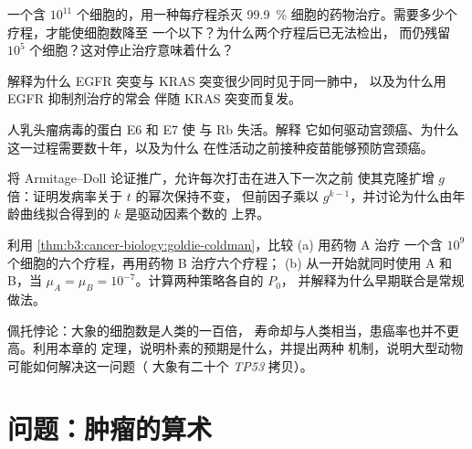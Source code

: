 \begin{exercise}[$\star\star$]\label{exo:b3:cancer-biology:7}
一个含 $10^{11}$ 个细胞的，用一种每疗程杀灭
\qty{99.9}{\%} 细胞的药物治疗。需要多少个疗程，才能使细胞数降至
一个以下？为什么两个疗程后已无法检出，
而仍残留 $10^{5}$ 个细胞？这对停止治疗意味着什么？
\end{exercise}

\begin{exercise}[$\star\star$]\label{exo:b3:cancer-biology:8}
解释为什么 EGFR 突变与 KRAS 突变很少同时见于同一肺中，
以及为什么用 EGFR 抑制剂治疗的常会
伴随 KRAS 突变而复发。
\end{exercise}

\begin{exercise}[$\star\star$]\label{exo:b3:cancer-biology:9}
人乳头瘤病毒的蛋白 E6 和 E7 使  与 Rb 失活。解释
它如何驱动宫颈癌、为什么这一过程需要数十年，以及为什么
在性活动之前接种疫苗能够预防宫颈癌。
\end{exercise}

\begin{exercise}[$\star\star\star$]\label{exo:b3:cancer-biology:10}
将 Armitage–Doll 论证推广，允许每次打击在进入下一次之前
使其克隆扩增 $g$ 倍：证明发病率关于 $t$ 的幂次保持不变，
但前因子乘以 $g^{k-1}$，并讨论为什么由年龄曲线拟合得到的
$k$ 是驱动因素个数的
上界。
\end{exercise}

\begin{exercise}[$\star\star\star$]\label{exo:b3:cancer-biology:11}
利用 \cref{thm:b3:cancer-biology:goldie-coldman}，比较 (a) 用药物 A 治疗
一个含 $10^{9}$ 个细胞的六个疗程，再用药物 B 治疗六个疗程；
(b) 从一开始就同时使用 A 和 B，当 $\mu_{A} =
\mu_{B} = 10^{-7}$。计算两种策略各自的 $P_{0}$，
并解释为什么早期联合是常规做法。
\end{exercise}

\begin{exercise}[$\star\star\star$]\label{exo:b3:cancer-biology:12}
佩托悖论：大象的细胞数是人类的一百倍，
寿命却与人类相当，患癌率也并不更高。利用本章的
定理，说明朴素的预期是什么，并提出两种
机制，说明大型动物可能如何解决这一问题（
大象有二十个 \emph{TP53} 拷贝）。
\end{exercise}

\section{问题：肿瘤的算术}

